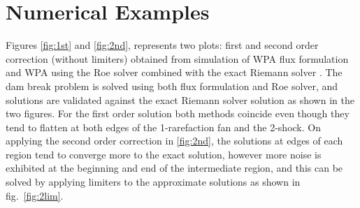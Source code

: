 \documentclass[11pt,a4paper]{article}
\begin{document}
	\section{Numerical Examples}
	
	Figures \ref{fig:1st} and  \ref{fig:2nd}, represents two plots: first  and second order correction (without limiters) obtained from simulation of WPA flux formulation \cite{ba-le-mi-ro:2003}and WPA using the Roe solver \cite{barzgaran2019numerical} combined with the exact Riemann solver \cite{ge:2008}. The dam break problem is solved using both flux formulation and  Roe solver, and  solutions are validated against the exact Riemann solver solution as shown in the two figures. For the first order solution both methods coincide even though they tend to flatten at both edges of the 1-rarefaction fan and the 2-shock. On applying the second order correction in  \ref{fig:2nd}, the solutions at edges of each region tend to converge more to the exact solution, however more noise is exhibited at the beginning and end of the intermediate region, and this can be solved by applying limiters to the approximate solutions as shown in fig.~\ref{fig:2lim}. \\
	
\end{document}
